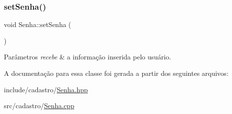 \subsubsection{\texorpdfstring{setSenha()}{setSenha()}}
{\footnotesize\ttfamily void Senha\+::set\+Senha (\begin{DoxyParamCaption}{ }\end{DoxyParamCaption})}


\begin{DoxyParams}{Parâmetros}
{\em recebe} & a informação inserida pelo usuário. \\
\hline
\end{DoxyParams}


A documentação para essa classe foi gerada a partir dos seguintes arquivos\+:\begin{DoxyCompactItemize}
\item 
include/cadastro/\mbox{\hyperlink{_senha_8hpp}{Senha.\+hpp}}\item 
src/cadastro/\mbox{\hyperlink{_senha_8cpp}{Senha.\+cpp}}\end{DoxyCompactItemize}
